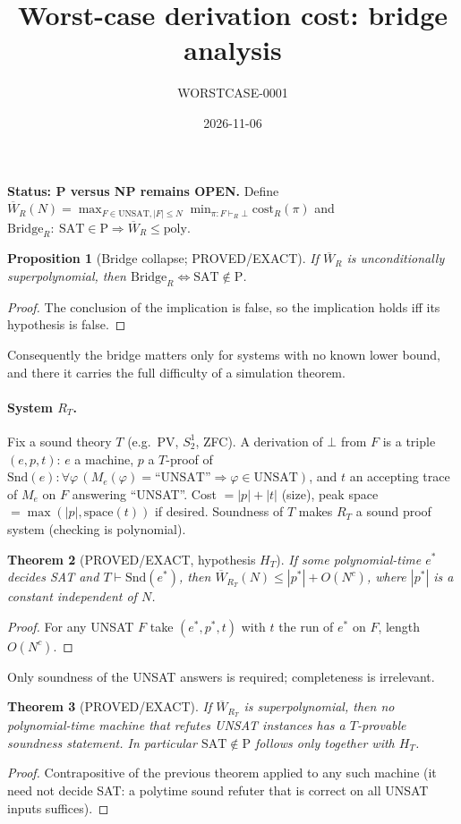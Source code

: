 \documentclass{article}\usepackage{amsmath,amssymb,amsthm}
\newtheorem{thm}{Theorem}\newtheorem{prop}[thm]{Proposition}
\begin{document}
\title{Worst-case derivation cost: bridge analysis}\author{WORSTCASE-0001}\date{2026-11-06}\maketitle
\noindent\textbf{Status: P versus NP remains OPEN.} Define $\overline W_R(N)=\max_{F\in\mathrm{UNSAT},|F|\le N}\min_{\pi:F\vdash_R\bot}\mathrm{cost}_R(\pi)$ and $\mathrm{Bridge}_R:\ \mathrm{SAT}\in\mathrm P\Rightarrow\overline W_R\le\mathrm{poly}$.

\begin{prop}[Bridge collapse; PROVED/EXACT] If $\overline W_R$ is unconditionally superpolynomial, then $\mathrm{Bridge}_R\iff \mathrm{SAT}\notin\mathrm P$.\end{prop}
\begin{proof} The conclusion of the implication is false, so the implication holds iff its hypothesis is false.\end{proof}
Consequently the bridge matters only for systems with no known lower bound, and there it carries the full difficulty of a simulation theorem.

\paragraph{System $R_T$.} Fix a sound theory $T$ (e.g.\ PV, $S^1_2$, ZFC). A derivation of $\bot$ from $F$ is a triple $(e,p,t)$: $e$ a machine, $p$ a $T$-proof of $\mathrm{Snd}(e):\forall\varphi\,(M_e(\varphi)=\text{``UNSAT''}\Rightarrow\varphi\in\mathrm{UNSAT})$, and $t$ an accepting trace of $M_e$ on $F$ answering ``UNSAT''. Cost $=|p|+|t|$ (size), peak space $=\max(|p|,\text{space}(t))$ if desired. Soundness of $T$ makes $R_T$ a sound proof system (checking is polynomial).

\begin{thm}[PROVED/EXACT, hypothesis $H_T$] If some polynomial-time $e^*$ decides SAT and $T\vdash\mathrm{Snd}(e^*)$, then $\overline W_{R_T}(N)\le |p^*|+O(N^c)$, where $|p^*|$ is a constant independent of $N$.\end{thm}
\begin{proof} For any UNSAT $F$ take $(e^*,p^*,t)$ with $t$ the run of $e^*$ on $F$, length $O(N^c)$.\end{proof}
Only soundness of the UNSAT answers is required; completeness is irrelevant.

\begin{thm}[PROVED/EXACT] If $\overline W_{R_T}$ is superpolynomial, then no polynomial-time machine that refutes UNSAT instances has a $T$-provable soundness statement. In particular $\mathrm{SAT}\notin\mathrm P$ follows only together with $H_T$.\end{thm}
\begin{proof} Contrapositive of the previous theorem applied to any such machine (it need not decide SAT: a polytime sound refuter that is correct on all UNSAT inputs suffices).\end{proof}
\end{document}
